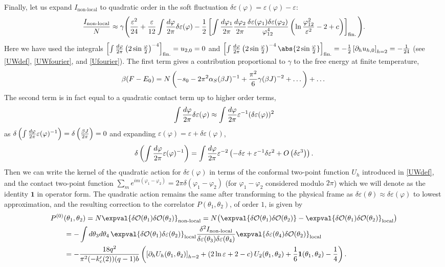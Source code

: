 \documentclass[12pt]{article}
\newcommand{\loc}{\text{local}}
\newcommand{\nloc}{\text{non-local}}
\newcommand{\OO}{\mathcal{O}}
\newcommand{\unit}{\mathbf{1}}
\newcommand{\al}{\alpha}
\newcommand{\tht}{\theta}
\newcommand{\ga}{\gamma}
\newcommand{\de}{\delta}
\newcommand{\vep}{\varepsilon}
\newcommand{\vp}{\varphi}
\newcommand{\be}{\begin{equation}}
\newcommand{\ee}{\end{equation}}
\newcommand{\bea}{\begin{eqnarray}}
\newcommand{\eea}{\end{eqnarray}}
\newcommand{\ov}{\over}
\newcommand{\p}{\partial}
\begin{document}
Finally, let us expand $I_{\nloc}$ to quadratic order in the soft fluctuation $\de \vep(\vp)=\vep(\vp)-\vep$:
\be \label{Inlfinexp}
{I_{\nloc} \ov N}\approx \ga\Bigg({\vep^2 \ov 24} + {\vep \ov 12}\int{d\vp \ov 2 \pi}\de \vep(\vp)-{1 \ov 2}\left[\int{d\vp_1 \ov 2 \pi}{d\vp_2 \ov 2 \pi}{\de \vep(\vp_1)\de \vep(\vp_2) \ov \vp_{12}^4} \left( \ln{\vp_{12}^2 \ov \vep^2}-2+c\right)\right]_{\text{fin.}}\Bigg).
\ee
Here we have used the integrals $\left[\int{d\vp \ov 2 \pi}\left(2 \sin{\vp \ov 2}\right)^{-4}\right]_{\text{fin.}}=u_{2,0}=0$ and $\left[\int{d\vp \ov 2 \pi}\left(2 \sin{\vp \ov 2}\right)^{-4}\abs{2 \sin{\vp \ov 2}}\right]_{\text{fin.}}=-{1 \ov 2}\left[\p_h u_{h,0}\right]_{h=2}=-{1 \ov 24}$ (see \eqref{UWdef}, \eqref{UWfourier}, and \eqref{Ufourier}). The first term gives a contribution proportional to $\ga$ to the free energy at finite temperature,
\be
\beta(F -E_0)=N\left(-s_0 - 2 \pi^2 \al_S (\beta J)^{-1}+{\pi^2 \ov 6}\ga(\beta J)^{-2}+\dots\right)+\dots
\ee
The second term is in fact equal to a quadratic contact term up to higher order terms,
\be
\int {d\vp \ov 2\pi} \de \vep(\vp) \approx \int {d\vp \ov 2\pi}\vep^{-1}(\de \vep(\vp))^2
\ee
as $\de\left(\int{d \vp \ov 2 \pi}\vep(\vp)^{-1} \right)=\de\left({\beta J \ov 2 \pi}\right)=0$ and expanding $\vep(\vp)=\vep+ \de \vep(\vp)$,
\bea
\de\left(\int{d \vp \ov 2 \pi}\vep(\vp)^{-1} \right)=\int{d\vp \ov 2 \pi}\vep^{-2}\left( -\de \vep + \vep^{-1}\de \vep^2+O\left(\de \vep^3 \right)\right).
\eea
Then we can write the kernel of the quadratic action for $\de \vep(\vp)$ in terms of the conformal two-point function $U_h$ introduced in \eqref{UWdef},
and the contact two-point function $\sum_m e^{im(\vp_1-\vp_2)}=2\pi\de(\vp_1-\vp_2)$ (for $\vp_1-\vp_2$ considered modulo $2\pi$) which we will denote as the identity $\unit$ in operator form. The quadratic action remains the same after transforming to the physical frame as $\de \vep(\tht) \approx \de \vep(\vp)$ to lowest approximation, and the resulting correction to the correlator $P(\tht_1, \tht_2)$, of order $1$, is given by
\begin{align}
P^{(0)}(\tht_1, \tht_2) \hspace{-30pt}&\hspace{30pt}
=N\expval{\de \OO(\tht_1)\de \OO(\tht_2)}_{\nloc}=N \bigl( \expval{\de \OO(\tht_1)\de \OO(\tht_2)}-\expval{\de \OO(\tht_1)\de \OO(\tht_2)}_{\loc}\bigr)\nonumber\\
\label{Pcorr}
&=-\int d\tht_3 d\tht_4\, \expval{\de \OO(\tht_1)\de \vep(\tht_2)}_{\loc} {\de^2 I_{\nloc} \ov \de \vep(\tht_3)\de \vep(\tht_4)}\expval{\de \vep(\tht_4)\de \OO(\tht_2)}_{\loc}
\\
&=-{18 q^2 \ov \pi^2(-k_c'(2)) (q-1)b}\left(\left[ \p_h U_h(\tht_1, \tht_2)\right]_{h=2}+\left( 2\ln \vep + 2-c\right)U_2(\tht_1, \tht_2) +{1 \ov 6}\unit(\tht_1, \tht_2) -{1 \ov 4} \right).\nonumber
\end{align}
\end{document}
